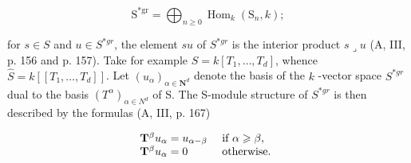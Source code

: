 \[
\mathrm{S} ^ {* \mathrm{gr}} = \bigoplus_ {n \geqslant 0} \operatorname{Hom} _ {k} (\mathrm{S} _ {n}, k) ;
\]

for \(s \in S\) and \(u \in S^{*gr}\), the element \(su\) of \(S^{*gr}\) is the interior product \(s \lrcorner u\) (A, III, p. 156 and p. 157). Take for example \(S = k[T_1, \ldots, T_d]\), whence \(\widehat{S} = k[[T_1, \ldots, T_d]]\). Let \((u_\alpha)_{\alpha \in \mathbf{N}^d}\) denote the basis of the \(k\) -vector space \(S^{*gr}\) dual to the basis \((T^\alpha)_{\alpha \in N^d}\) of S. The S-module structure of \(S^{*gr}\) is then described by the formulas (A, III, p. 167)

\[
\begin{array}{l l} \mathbf {T} ^ {\beta} u _ {\alpha} = u _ {\alpha - \beta} & \text { if } \alpha \geqslant \beta , \\ \mathbf {T} ^ {\beta} u _ {\alpha} = 0 & \text { otherwise. } \end{array}
\]
